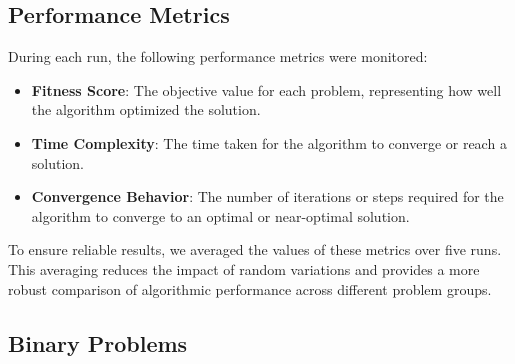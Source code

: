 \subsection{Performance Metrics}
During each run, the following performance metrics were monitored:
\begin{itemize}
    \item \textbf{Fitness Score}: The objective value for each problem, representing how well the algorithm optimized the solution.
    \item \textbf{Time Complexity}: The time taken for the algorithm to converge or reach a solution.
    \item \textbf{Convergence Behavior}: The number of iterations or steps required for the algorithm to converge to an optimal or near-optimal solution.
\end{itemize}

To ensure reliable results, we averaged the values of these metrics over five runs. This averaging reduces the impact of random variations and provides a more robust comparison of algorithmic performance across different problem groups.

\subsection{Binary Problems}

